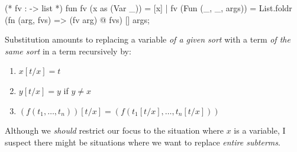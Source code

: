 \nwenddocs{}\endmoddef\nwstartdeflinemarkup{}\nwenddeflinemarkup
(* fv :  ->  list *)
fun fv (x as (Var _)) = [x]
  | fv (Fun (_, _, args)) = List.foldr (fn (arg, fvs) => (fv arg) @ fvs)
                                       []
                                       args;
\eatline
{}\nwendcode{}\nwdocspar
\begin{node}
Substitution amounts to replacing a variable \emph{of a given sort}
with a term \emph{of the same sort} in a term recursively by:
\begin{enumerate}
\item $x[t/x]=t$ 
\item $y[t/x]=y$ if $y\neq x$
\item $(f(t_{1},\dots,t_{n}))[t/x]=(f(t_{1}[t/x],\dots,t_{n}[t/x]))$
\end{enumerate}
Although we \emph{should} restrict our focus to the situation where
$x$ is a variable, I suspect there might be situations where we want
to replace \emph{entire subterms}.
\end{node}

